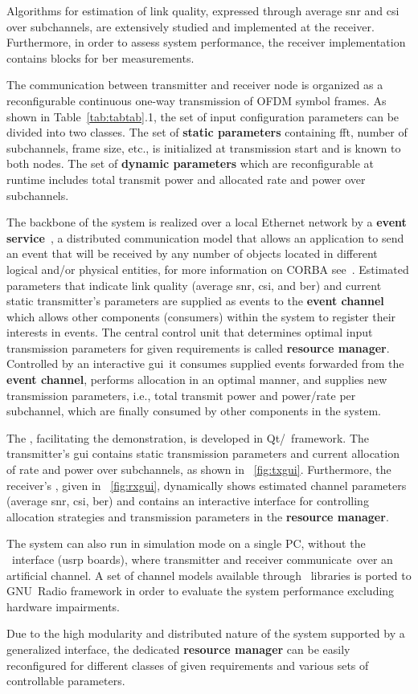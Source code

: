%
Algorithms for estimation of link quality, expressed through average \gls{snr} and \gls{csi} over subchannels, are extensively studied and implemented at the receiver. Furthermore, in order to assess system performance, the receiver implementation contains blocks for \gls{ber} measurements.

The communication between transmitter and receiver node is organized as a reconfigurable continuous one-way transmission of OFDM symbol frames. As shown in Table~\ref{tab:tabtab}.1, the set of input configuration parameters can be divided into two classes. The set of \textbf{static parameters} containing \gls{fft}, number of subchannels, frame size, etc., is initialized at transmission start and is known to both nodes. The set of \textbf{dynamic parameters} which are reconfigurable at runtime includes total transmit power and allocated rate and power over subchannels.

The backbone of the system is realized over a local Ethernet network by a \CORBA{} \textbf{event service}~\cite{GNUCORBA}, a distributed communication model that allows an application to send an event that will be received by any number of objects located in different logical and/or physical entities, for more information on CORBA see~\cite{Mowbray,Orfali}. Estimated parameters that indicate link quality (average \gls{snr}, \gls{csi}, and \gls{ber}) and current static transmitter's parameters are supplied as \CORBA{} events to the \textbf{event channel} which allows other components (consumers) within the system to register their interests in events. The central control unit that determines optimal input transmission parameters for given requirements is called \textbf{resource manager}. Controlled by an interactive \gls{gui}\ it consumes supplied events forwarded from the \textbf{event channel}, performs allocation in an optimal manner, and supplies new transmission parameters, i.e., total transmit power and power/rate per subchannel, which are finally consumed by other components in the system.

The \GUI, facilitating the demonstration, is developed in Qt/\Cpp\ framework. The transmitter's \gls{gui} contains static transmission parameters and current allocation of rate and power over subchannels, as shown in ~\cref{fig:txgui}. Furthermore, the receiver's \GUI, given in ~\cref {fig:rxgui}, dynamically shows estimated channel parameters (average \gls{snr}, \gls{csi}, \gls{ber}) and contains an interactive interface for controlling allocation strategies and transmission parameters in the \textbf{resource manager}. 

The system can also run in simulation mode on a single PC, without the \RF \ interface (\gls{usrp} boards), where transmitter and receiver \glqq communicate\grqq\ over an artificial channel. A set of channel models available through \ITpp\ libraries \cite{GNUITPP} is ported to GNU~Radio framework in order to evaluate the system performance excluding hardware impairments.

Due to the high modularity and distributed nature of the system supported by a generalized interface, the dedicated \textbf{resource manager} can be easily reconfigured for different classes of given requirements and various sets of controllable parameters.
